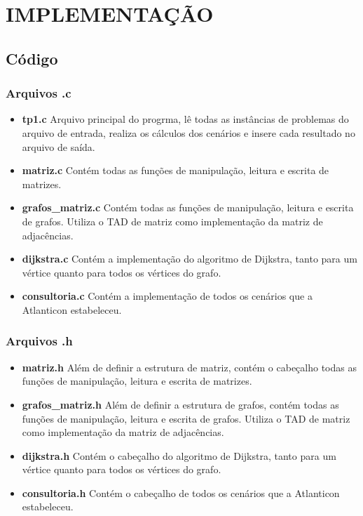 \documentclass[12pt]{article}
\begin{document}
\section{IMPLEMENTAÇÃO}
\label{implementacao}

\subsection{Código}

\subsubsection{Arquivos .c}

\begin{itemize}
\item \textbf{tp1.c} Arquivo principal do progrma, lê todas as instâncias de problemas do arquivo de entrada, realiza os cálculos dos cenários e insere cada resultado no arquivo de saída.
\item \textbf{matriz.c} Contém todas as funções de manipulação, leitura e escrita de matrizes.
\item \textbf{grafos\_matriz.c} Contém todas as funções de manipulação, leitura e escrita de grafos. Utiliza o TAD de matriz como implementação da matriz de adjacências.
\item \textbf{dijkstra.c} Contém a implementação do algoritmo de Dijkstra, tanto para um vértice quanto para todos os vértices do grafo.
\item \textbf{consultoria.c} Contém a implementação de todos os cenários que a Atlanticon estabeleceu.
\end{itemize}

\subsubsection{Arquivos .h}

\begin{itemize}
\item \textbf{matriz.h} Além de definir a estrutura de matriz, contém o cabeçalho todas as funções de manipulação, leitura e escrita de matrizes.
\item \textbf{grafos\_matriz.h} Além de definir a estrutura de grafos, contém todas as funções de manipulação, leitura e escrita de grafos. Utiliza o TAD de matriz como implementação da matriz de adjacências.
\item \textbf{dijkstra.h} Contém o cabeçalho do algoritmo de Dijkstra, tanto para um vértice quanto para todos os vértices do grafo.
\item \textbf{consultoria.h} Contém o cabeçalho de todos os cenários que a Atlanticon estabeleceu.
\end{itemize}
\end{document}
